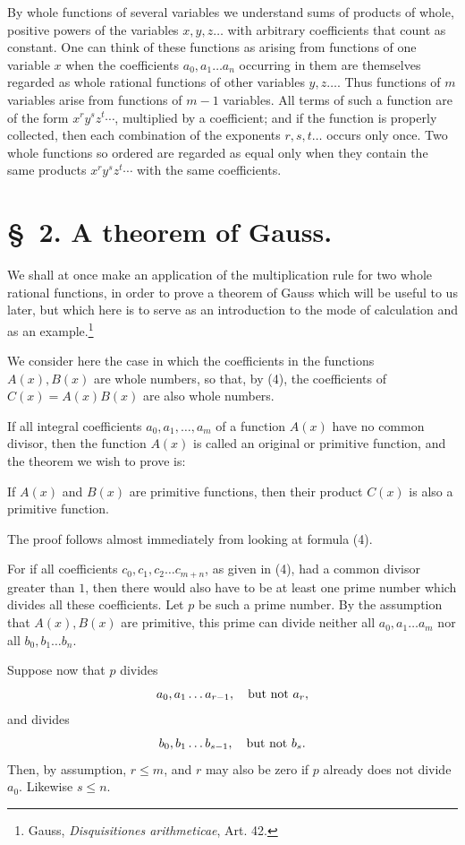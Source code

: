 \documentclass[11pt]{article}
\begin{document}
By whole functions of several variables we understand sums of products of whole, positive powers of the variables $x,y,z\ldots$ with arbitrary coefficients that count as constant. One can think of these functions as arising from functions of one variable $x$ when the coefficients $a_0,a_1\ldots a_n$ occurring in them are themselves regarded as whole rational functions of other variables $y,z\ldots$. Thus functions of $m$ variables arise from functions of $m-1$ variables. All terms of such a function are of the form $x^r y^s z^t\cdots$, multiplied by a coefficient; and if the function is properly collected, then each combination of the exponents $r,s,t\ldots$ occurs only once. Two whole functions so ordered are regarded as equal only when they contain the same products $x^r y^s z^t\cdots$ with the same coefficients.

\section*{\S~2. A theorem of Gauss.}

We shall at once make an application of the multiplication rule for two whole rational functions, in order to prove a theorem of Gauss which will be useful to us later, but which here is to serve as an introduction to the mode of calculation and as an example.\footnote{Gauss, \emph{Disquisitiones arithmeticae}, Art. 42.}

We consider here the case in which the coefficients in the functions $A(x),B(x)$ are whole numbers, so that, by (4), the coefficients of $C(x)=A(x)B(x)$ are also whole numbers.

If all integral coefficients $a_0,a_1,\ldots,a_m$ of a function $A(x)$ have no common divisor, then the function $A(x)$ is called an original or primitive function, and the theorem we wish to prove is:

If $A(x)$ and $B(x)$ are primitive functions, then their product $C(x)$ is also a primitive function.

The proof follows almost immediately from looking at formula (4).

For if all coefficients $c_0,c_1,c_2\ldots c_{m+n}$, as given in (4), had a common divisor greater than $1$, then there would also have to be at least one prime number which divides all these coefficients. Let $p$ be such a prime number. By the assumption that $A(x),B(x)$ are primitive, this prime can divide neither all $a_0,a_1\ldots a_m$ nor all $b_0,b_1\ldots b_n$.

Suppose now that $p$ divides
\[
 a_0,a_1\ldots a_{r-1},\quad \hbox{but not }a_r,
\]
and divides
\[
 b_0,b_1\ldots b_{s-1},\quad \hbox{but not }b_s.
\]
Then, by assumption, $r\le m$, and $r$ may also be zero if $p$ already does not divide $a_0$. Likewise $s\le n$.
\end{document}
